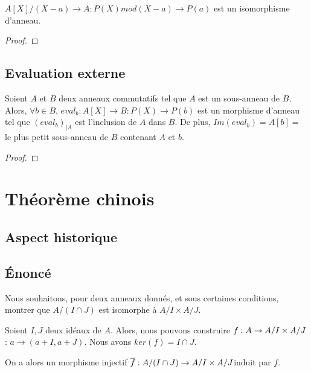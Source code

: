 \begin{proposition}
	$A[X] / (X - a) \rightarrow A : P(X) mod(X - a) \rightarrow P(a)$ est un
	isomorphisme d'anneau.
\end{proposition}

\ifdefined\outputproof
\begin{proof}

\end{proof}
\fi

\subsection{Evaluation externe}

\begin{proposition}
	Soient $A$ et $B$ deux anneaux commutatifs tel que $A$ est un sous-anneau de
	$B$. Alors, $\forall b \in B$, $eval_{b} : A[X] \rightarrow B : P(X)
	\rightarrow P(b)$ est un morphisme d'anneau tel que ${(eval_{b})}_{|A}$ est
	l'inclusion de $A$ dans $B$. De plus, $Im(eval_{b}) = A[b] = $ le plus petit
	sous-anneau de $B$ contenant $A$ et $b$. %
\end{proposition}

\ifdefined\outputproof
\begin{proof}

\end{proof}
\fi


\section{Théorème chinois}

\subsection{Aspect historique}

\subsection{Énoncé}
Nous souhaitons, pour deux anneaux donnés, et sous certaines conditions, montrer
que $A/(I \cap J)$ est isomorphe à $A/I \times A/J$.

Soient $I, J$ deux idéaux de $A$. Alors, nous pouvons construire
$f : A \rightarrow A/I \times A/J$ : $a \rightarrow (a + I, a + J)$.
Nous avons $ker(f) = I \cap J$.

On a alors un morphisme injectif $\overline{f} : A/(I \cap
J) \rightarrow A/I \times A/J$induit par $f$.


